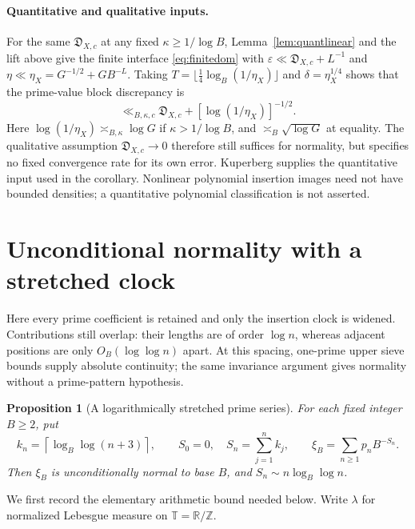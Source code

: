 \documentclass[11pt,a4paper]{article}
\newtheorem{proposition}[theorem]{Proposition}
\newcommand{\Z}{\mathbb Z}
\newcommand{\R}{\mathbb R}
\begin{document}
\paragraph{Quantitative and qualitative inputs.}
For the same $\mathfrak D_{X,c}$ at any fixed $\kappa\ge1/\log B$,
Lemma~\ref{lem:quantlinear} and the lift above give the finite interface
\eqref{eq:finitedom} with
$\varepsilon\ll\mathfrak D_{X,c}+L^{-1}$ and
$\eta\ll\eta_X=G^{-1/2}+GB^{-L}$.
Taking $T=\lfloor\frac14\log_B(1/\eta_X)\rfloor$ and
$\delta=\eta_X^{1/4}$ shows that the prime-value block discrepancy is
\[
 \ll_{B,\kappa,c}\mathfrak D_{X,c}
                         +[\log(1/\eta_X)]^{-1/2}.
\]
Here $\log(1/\eta_X)\asymp_{B,\kappa}\log G$ if
$\kappa>1/\log B$, and $\asymp_B\sqrt{\log G}$ at equality.
The qualitative assumption $\mathfrak D_{X,c}\to0$ therefore still suffices
for normality, but specifies no fixed convergence rate for its own error.
Kuperberg supplies the quantitative input used in the corollary.
Nonlinear polynomial insertion images need not have bounded densities;
a quantitative polynomial classification is not asserted.

\section{Unconditional normality with a stretched clock}
\label{app:stretchedclock}

Here every prime coefficient is retained and only the insertion clock
is widened. Contributions still overlap: their lengths are of order
$\log n$, whereas adjacent positions are only $O_B(\log\log n)$ apart.
At this spacing, one-prime upper sieve bounds supply absolute continuity;
the same invariance argument gives normality without a prime-pattern hypothesis.

\begin{proposition}[A logarithmically stretched prime series]
\label{prop:stretchedclock}
For each fixed integer $B\ge2$, put
\[
 k_n=\left\lceil\log_B\log(n+3)\right\rceil,\qquad
 S_0=0,\quad S_n=\sum_{j=1}^n k_j,\qquad
 \xi_B=\sum_{n\ge1}p_nB^{-S_n}.
\]
Then $\xi_B$ is unconditionally normal to base $B$, and
$S_n\sim n\log_B\log n$.
\end{proposition}

We first record the elementary arithmetic bound needed below.
Write $\lambda$ for normalized Lebesgue measure on $\mathbb T=\R/\Z$.
\end{document}
